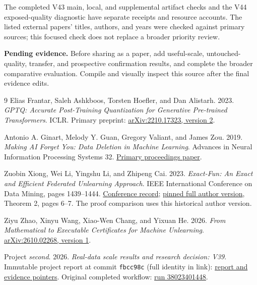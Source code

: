 \documentclass[10pt,twocolumn,letterpaper]{article}
\newcommand{\pending}[1]{\par\noindent\textbf{Pending evidence.} #1\par}
\begin{document}
The completed V43 main, local, and supplemental artifact checks and the V44
exposed-quality diagnostic have separate receipts and resource accounts. The
listed external papers' titles, authors, and years were checked against primary
sources; this focused check does not replace a broader priority review.

\pending{Before sharing as a paper, add useful-scale, untouched-quality,
transfer, and prospective confirmation results, and complete the broader
comparative evaluation. Compile and visually inspect this source after the final
evidence edits.}

\begin{thebibliography}{9}
Elias Frantar, Saleh Ashkboos, Torsten Hoefler, and Dan Alistarh.
2023. \emph{GPTQ: Accurate Post-Training Quantization for Generative Pre-trained
Transformers}. ICLR. Primary preprint:
\href{https://arxiv.org/abs/2210.17323v2}{arXiv:2210.17323, version 2}.

Antonio A. Ginart, Melody Y. Guan, Gregory Valiant, and James Zou.
2019. \emph{Making AI Forget You: Data Deletion in Machine Learning}.
Advances in Neural Information Processing Systems 32.
\href{https://papers.nips.cc/paper_files/paper/2019/file/cb79f8fa58b91d3af6c9c991f63962d3-Paper.pdf}{Primary proceedings paper}.

Zuobin Xiong, Wei Li, Yingshu Li, and Zhipeng Cai.
2023. \emph{Exact-Fun: An Exact and Efficient Federated Unlearning Approach}.
IEEE International Conference on Data Mining, pages 1439--1444.
\href{https://doi.org/10.1109/ICDM58522.2023.00188}{Conference record};
\href{https://github.com/zuobinxiong/zuobinxiong.github.io/blob/300a0672be8d265ddebf20d6e69f790456a1bd81/assets/pdf/ExactFedUnlearning.pdf}{pinned full author version},
Theorem 2, pages 6--7. The proof comparison uses this historical author version.

Ziyu Zhao, Xinyu Wang, Xiao-Wen Chang, and Yixuan He.
2026. \emph{From Mathematical to Executable Certificates for Machine Unlearning}.
\href{https://arxiv.org/html/2610.02268v1}{arXiv:2610.02268, version 1}.

Project \emph{second}. 2026. \emph{Real-data scale results and research decision:
V39}. Immutable project report at commit
\texttt{fbcc98c} (full identity in link):
\href{https://github.com/priyankjairaj100/second/blob/fbcc98c6559de4b88ffc9c8b960cf680d89e29d3/docs/SCALE_RESULTS_V39.md}{report and evidence pointers}.
Original completed workflow:
\href{https://github.com/priyankjairaj100/second/actions/runs/38023401448}{run 38023401448}.


\end{thebibliography}
\end{document}

